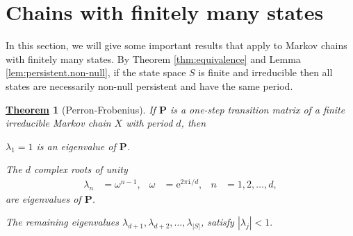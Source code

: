 \documentclass[12pt]{book}
\numberwithin{equation}{chapter}
\theoremstyle{plain}
\newtheorem{theorem}{\underline{Theorem}}
\numberwithin{theorem}{section}
\theoremstyle{definition}
\numberwithin{exercise}{chapter}
\newcommand{\<}{\langle}
\renewcommand{\>}{\rangle}
\renewcommand{\(}{\left(}
\renewcommand{\)}{\right)}
\renewcommand{\[}{\left[}
\renewcommand{\]}{\right]}
\newcommand\om{\omega}
\newcommand\lam{\lambda}
\newcommand\Pv{\pmb{P}}
\newcommand\ii{\mathtt{i}}
\newcommand\ee{\mathrm{e}}
\begin{document}
\section{Chains with finitely many states}
\label{sec:finite.chains}

In this section, we will give some important results that apply to Markov chains with finitely many states.
By Theorem \ref{thm:equivalence} and Lemma \ref{lem:persistent.non-null}, if the state space $S$ is finite and irreducible then all states are necessarily non-null persistent and have the same period.

\begin{theorem}[Perron-Frobenius]
If $\Pv$ is a one-step transition matrix of a finite irreducible Markov chain $X$ with period $d$, then
\begin{enumerate*}
\item $\lam_1 = 1$ is an eigenvalue of $\Pv$.
\item The $d$ complex roots of unity
\begin{align}
\lam_n
	&=	\om^{n-1} , &
\om 
	&= \ee^{2 \pi \ii / d} , &
n
	&=	1, 2, \ldots, d, 
\end{align}
are eigenvalues of $\Pv$.
\item The remaining eigenvalues $\lam_{d+1}, \lam_{d+2}, \ldots , \lam_{|S|}$, satisfy $|\lam_j| < 1.$
\end{enumerate*} 
\end{theorem}
\end{document}
